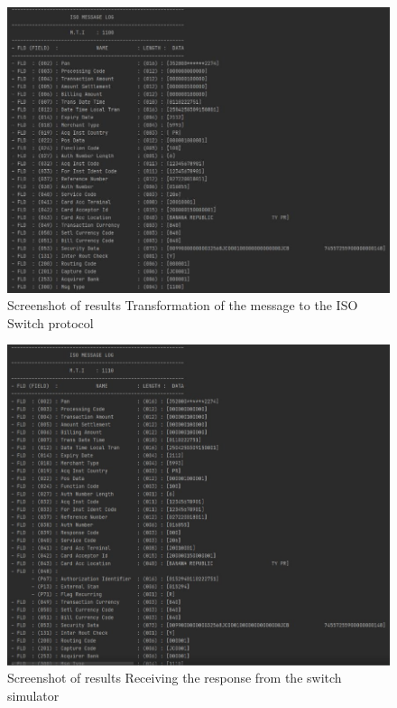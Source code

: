 \documentclass[12pt,a4paper]{report}
\begin{document}
\begin{figure}[H]
\centering
\includegraphics[width=\textwidth,height=\textheight,keepaspectratio]{media/image80.jpeg}
\caption{Screenshot of results Transformation of the message to the ISO Switch protocol}
\label{fig:RRMP}
\end{figure} 



\begin{figure}[H]
\centering
\includegraphics[width=\textwidth,height=\textheight,keepaspectratio]{media/image81.jpeg}
\caption{Screenshot of results
Receiving the response from the switch simulator}
\label{fig:RRSS}
\end{figure} 
\end{document}
